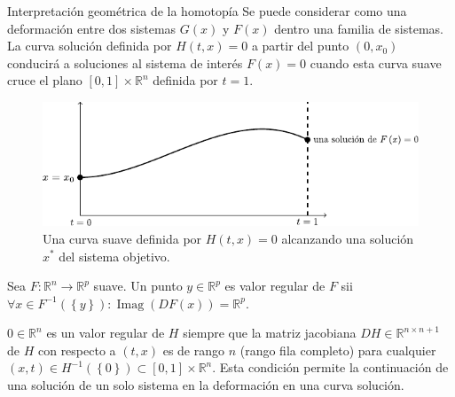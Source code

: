 \begin{frame}
	\begin{alertblock}{Interpretación geométrica de la homotopía}
		Se puede considerar como una deformación entre dos sistemas
		$G\left(x\right)$ y $F\left(x\right)$ dentro una familia de
		sistemas.
		La curva solución definida por
		\begin{math}
			H\left(t,x\right)=0
		\end{math}
		a partir del punto
		\begin{math}
			\left(0,x_{0}\right)
		\end{math}
		conducirá a soluciones al sistema de interés
		\begin{math}
			F\left(x\right)=
			0
		\end{math}
		cuando esta curva suave cruce el plano
		\begin{math}
			\left[0,1\right]\times\mathbb{R}^{n}
		\end{math}
		definida por $t=1$.
	\end{alertblock}
	\begin{figure}[ht!]
		\centering
		\includegraphics[width=0.65\paperwidth]{homotopy}
		\caption{
			Una curva suave definida por $H\left(t,x\right)=0$ alcanzando
			una solución $x^{\ast}$ del sistema objetivo.
		}
	\end{figure}

	\begin{definition}
		Sea $F\colon\mathbb{R}^{n}\to\mathbb{R}^{p}$ suave.
		Un punto $y\in\mathbb{R}^{p}$ es \alert{valor regular} de $F$ sii
		\begin{math}
			\forall x\in F^{-1}\left(\left\{y\right\}\right):
			\operatorname{Imag}\left(DF\left(x\right)\right)=
			\mathbb{R}^{p}
		\end{math}.
	\end{definition}

	$0\in\mathbb{R}^{n}$ es un valor regular de $H$ siempre que
	la matriz jacobiana $DH\in\mathbb{R}^{n\times n+1}$ de $H$ con
	respecto a $\left(t,x\right)$ es de rango $n$ (rango fila completo)
	para cualquier
	\begin{math}
		\left(x,t\right)\in
		H^{-1}\left(\left\{0\right\}\right)\subset
		\left[0,1\right]\times\mathbb{R}^{n}
	\end{math}.
	Esta condición permite la continuación de una solución de un solo
	sistema en la deformación en una curva solución.
\end{frame}